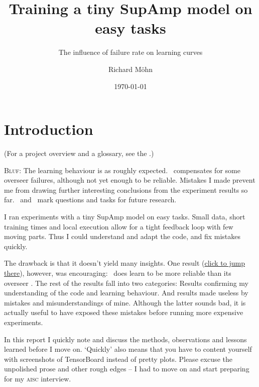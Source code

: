 \documentclass{farlamp}
\title{Training a tiny SupAmp model on easy tasks}
\subtitle{The influence of failure rate on learning curves}
\author{Richard Möhn}
\date{\today}
\begin{document}
\maketitle
\tableofcontents

\section{Introduction}

(For a project overview and a glossary, see the \FarlampRepo.)

\textsc{Bluf}: The learning behaviour is as roughly expected. \Xpa\ compensates
for some overseer failures, although not yet enough to be reliable. Mistakes I
made prevent me from drawing further interesting conclusions from the experiment
results so far. \OQsymbol\ and \TODOsymbol\ mark questions and tasks for future
research.

I ran experiments with a tiny SupAmp model on easy tasks. Small data, short
training times and local execution allow for a tight feedback loop with few
moving parts. Thus I could understand and adapt the code, and fix mistakes
quickly.

The drawback is that it doesn't yield many insights. One result
(\hyperlink{interesting}{click to jump there}), however, was encouraging: \Xpa\
does learn to be more reliable than its overseer \AmpHp. The rest of the results
fall into two categories: Results confirming my understanding of the code and
learning behaviour. And results made useless by mistakes and misunderstandings
of mine. Although the latter sounds bad, it is actually useful to have exposed
these mistakes before running more expensive experiments.

In this report I quickly note and discuss the methods, observations and lessons
learned before I move on. ‘Quickly’ also means that you have to content yourself
with screenshots of TensorBoard instead of pretty plots. Please excuse the
unpolished prose and other rough edges – I had to move on and start preparing
for my \textsc{aisc} interview.


\end{document}
